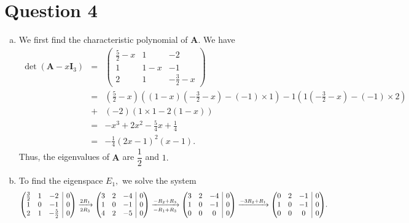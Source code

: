 \documentclass{article}
\makeatletter
\newenvironment{rowequmat}[1]{\left(\array{@{}#1@{}}}{\endarray\right)}
\makeatother
\begin{document}
\section*{Question 4}
\begin{enumerate}[(a)]
    \item We first find the characteristic polynomial of $\textbf{A}.$ We have
    \begin{eqnarray*}
    \det(\textbf{A}-x\textbf{I}_3)&=&\begin{pmatrix}\frac{5}{2}-x&1&-2\\1&1-x&-1\\2&1&-\frac{3}{2}-x\end{pmatrix}\\
    &=&\left(\frac{5}{2}-x\right)\left((1-x)\left(-\frac{3}{2}-x\right)-(-1)\times1\right)-1\left(1\left(-\frac{3}{2}-x\right)-(-1)\times2\right)\\
    &+&(-2)(1\times1-2(1-x))\\
    &=&-x^3+2x^2-\frac{5}{4}x+\frac{1}{4}\\
    &=&-\frac{1}{4}(2x-1)^2(x-1).
    \end{eqnarray*}
    Thus, the eigenvalues of $\textbf{A}$ are $\dfrac{1}{2}$ and $1.$
    \item To find the eigenspace $E_1,$ we solve the system
    \begin{eqnarray*}
    \begin{rowequmat}{ccc|c}
     \frac{3}{2} &  1 & -2 & 0 \\
     1 &  0 & -1 & 0 \\
     2 & 1 & -\frac{5}{2} & 0
    \end{rowequmat}\xrightarrow[2R_3]{2R_1}\begin{rowequmat}{ccc|c}
     3 & 2 & -4 & 0 \\
     1 & 0 & -1 & 0 \\
     4 & 2 & -5 & 0
    \end{rowequmat}\xrightarrow[-R_1+R_3]{-R_2+R_3}\begin{rowequmat}{ccc|c}
     3 & 2 & -4 & 0 \\
     1 & 0 & -1 & 0 \\
     0 & 0 & 0 & 0
    \end{rowequmat}
    \xrightarrow{-3R_2+R_1}\begin{rowequmat}{ccc|c}
     0 & 2 & -1 & 0 \\
     1 & 0 & -1 & 0 \\
     0 & 0 & 0 & 0
    \end{rowequmat}.

\end{eqnarray*}
\end{enumerate}
\end{document}
